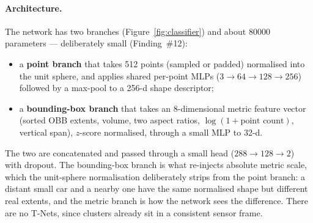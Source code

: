 \paragraph{Architecture.} The network has two branches
(Figure~\ref{fig:classifier}) and about \num{80000}
parameters --- deliberately small (Finding~\#12):
\begin{itemize}
  \item a \textbf{point branch} that takes \num{512} points (sampled or padded)
    normalised into the unit sphere, and applies shared per-point MLPs
    ($3 \to 64 \to 128 \to 256$) followed by a max-pool to a \num{256}-d shape
    descriptor;
  \item a \textbf{bounding-box branch} that takes an \num{8}-dimensional metric
    feature vector (sorted OBB extents, volume, two aspect ratios,
    $\log(1+\text{point count})$, vertical span), $z$-score normalised, through a
    small MLP to \num{32}-d.
\end{itemize}
The two are concatenated and passed through a small head
($288 \to 128 \to 2$) with dropout. The bounding-box branch is what re-injects
absolute metric scale, which the unit-sphere normalisation deliberately strips
from the point branch: a distant small car and a nearby one have the same
normalised shape but different real extents, and the metric branch is how the
network sees the difference. There are no T-Nets, since clusters already sit in a
consistent sensor frame.

